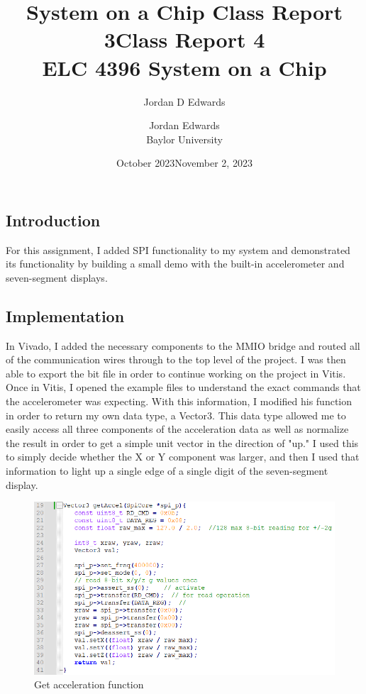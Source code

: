 \documentclass{article}
\title{System on a Chip Class Report 3}
\author{Jordan D Edwards}
\date{October 2023}
\begin{document}
	
	\title{Class Report 4
		\\ \large{ELC 4396 System on a Chip}  }
	
	\author{Jordan Edwards \\ Baylor University} %
	\date{November 2, 2023}
	\maketitle
	
	\subsection*{Introduction}
	For this assignment, I added SPI functionality to my system and demonstrated its functionality by building a small demo with the built-in accelerometer and seven-segment displays.
	
	
	\subsection*{Implementation}
	In Vivado, I added the necessary components to the MMIO bridge and routed all of the communication wires through to the top level of the project. I was then able to export the bit file in order to continue working on the project in Vitis. Once in Vitis, I opened the example files to understand the exact commands that the accelerometer was expecting. With this information, I modified his function in order to return my own data type, a Vector3. This data type allowed me to easily access all three components of the acceleration data as well as normalize the result in order to get a simple unit vector in the direction of "up." I used this to simply decide whether the X or Y component was larger, and then I used that information to light up a single edge of a single digit of the seven-segment display.
	
	\begin{figure}[H]
		\centering
		\includegraphics[width=\linewidth]{getAccel}
		\caption{Get acceleration function}
		\label{fig:func}
	\end{figure}
	
\end{document}
